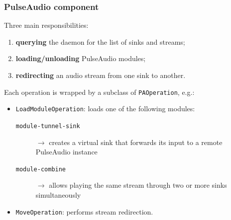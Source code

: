 \documentclass{beamer}
\begin{document}
\begin{frame}
\frametitle{PulseAudio component}
Three main responsibilities:
\begin{enumerate}
	\item \textbf{querying} the daemon for the list of sinks and streams;
	\item \textbf{loading/unloading} PulseAudio modules;
	\item \textbf{redirecting} an audio stream from one sink to another.
\end{enumerate}
\pause\vspace{3mm}
Each operation is wrapped by a subclass of \texttt{PAOperation}, e.g.:
\begin{itemize}
	\item \texttt{LoadModuleOperation}: loads one of the following modules:
	\begin{description}
		\item[\texttt{module-tunnel-sink}] $\rightarrow$ creates a virtual sink that forwards its input to a remote PulseAudio instance
		\item[\texttt{module-combine}] $\rightarrow$ allows playing the same stream through two or more sinks simultaneously
	\end{description}
	\item \texttt{MoveOperation}: performs stream redirection.
\end{itemize}
\end{frame}
\end{document}
